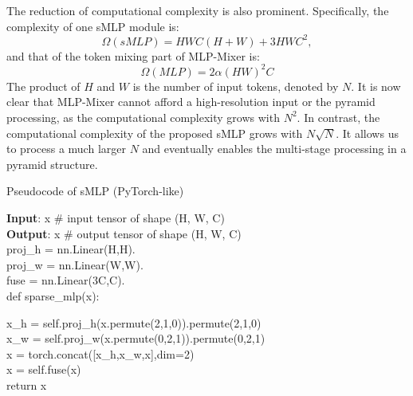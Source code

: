 \documentclass[letterpaper]{article} \usepackage{aaai22}  \usepackage{times}  \usepackage{helvet}  \usepackage{courier}  \usepackage[hyphens]{url}  \usepackage{graphicx} \usepackage{color}
\begin{document}
The reduction of computational complexity is also prominent. Specifically, the complexity of one sMLP module is:
\begin{equation}
    \Omega(sMLP) = HWC(H+W)+3HWC^{2},
\end{equation}
and that of the token mixing part of MLP-Mixer is:
\begin{equation}
    \Omega(MLP) = 2\alpha(HW)^{2}C
\end{equation}
The product of $H$ and $W$ is the number of input tokens, denoted by $N$. It is now clear that MLP-Mixer cannot afford a high-resolution input or the pyramid processing, as the computational complexity grows with $N^2$. In contrast, the computational complexity of the proposed sMLP grows with $N\sqrt{N}$. It allows us to process a much larger $N$ and eventually enables the multi-stage processing in a pyramid structure.

\begin{algorithm}[tb]
\caption{Pseudocode of sMLP (PyTorch-like)}
\label{alg:algorithm}
\textbf{Input}: x \# input tensor of shape (H, W, C)\\
\textbf{Output}: x \# output tensor of shape (H, W, C)\\

proj\_h = nn.Linear(H,H). \\
proj\_w = nn.Linear(W,W). \\
fuse = nn.Linear(3C,C). \\

def sparse\_mlp(x): \\
\begin{algorithmic}
\STATE    x\_h = self.proj\_h(x.permute(2,1,0)).permute(2,1,0) \\
    x\_w = self.proj\_w(x.permute(0,2,1)).permute(0,2,1) \\
    x = torch.concat([x\_h,x\_w,x],dim=2) \\
    x = self.fuse(x) \\
    
    return x
\end{algorithmic}
\end{algorithm}
\end{document}
